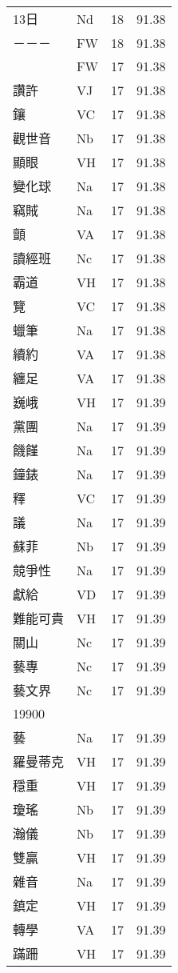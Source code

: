 \documentclass[twocolumn]{book}
\begin{document}
\begin{supertabular}{llrr}
13日 & Nd & 18 &  91.38\\
－－－ & FW & 18 &  91.38\\
 & FW & 17 &  91.38\\
讚許 & VJ & 17 &  91.38\\
鑲 & VC & 17 &  91.38\\
觀世音 & Nb & 17 &  91.38\\
顯眼 & VH & 17 &  91.38\\
變化球 & Na & 17 &  91.38\\
竊賊 & Na & 17 &  91.38\\
顫 & VA & 17 &  91.38\\
讀經班 & Nc & 17 &  91.38\\
霸道 & VH & 17 &  91.38\\
覽 & VC & 17 &  91.38\\
蠟筆 & Na & 17 &  91.38\\
續約 & VA & 17 &  91.38\\
纏足 & VA & 17 &  91.38\\
巍峨 & VH & 17 &  91.39\\
黨團 & Na & 17 &  91.39\\
饑饉 & Na & 17 &  91.39\\
鐘錶 & Na & 17 &  91.39\\
釋 & VC & 17 &  91.39\\
議 & Na & 17 &  91.39\\
蘇菲 & Nb & 17 &  91.39\\
競爭性 & Na & 17 &  91.39\\
獻給 & VD & 17 &  91.39\\
難能可貴 & VH & 17 &  91.39\\
關山 & Nc & 17 &  91.39\\
藝專 & Nc & 17 &  91.39\\
藝文界 & Nc & 17 &  91.39\\
19900\\
藝 & Na & 17 &  91.39\\
羅曼蒂克 & VH & 17 &  91.39\\
穩重 & VH & 17 &  91.39\\
瓊瑤 & Nb & 17 &  91.39\\
瀚儀 & Nb & 17 &  91.39\\
雙贏 & VH & 17 &  91.39\\
雜音 & Na & 17 &  91.39\\
鎮定 & VH & 17 &  91.39\\
轉學 & VA & 17 &  91.39\\
蹣跚 & VH & 17 &  91.39\\

\end{supertabular}
\end{document}
